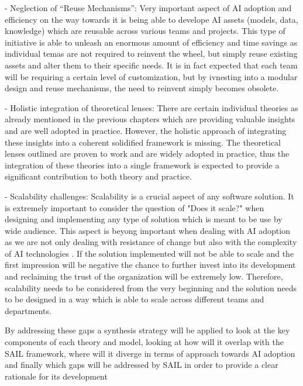 \documentclass[]{imc-inf}
\begin{document}
- Neglection of ``Reuse Mechanisms'': Very important aspect of AI adoption and efficiency on the way towards it is being able to develope AI assets (models, data, knowledge) which are reusable across various teams and projects. This type of initiative is able to unleash an enormous amount of efficiency and time savings as individual temas are not required to reinvent the wheel, but simply reuse existing assets and alter them to their specific needs. It is in fact expected that each team will be requiring a certain level of customization, but by ivnesting into a modular design and reuse mechanisms, the need to reinvent simply becomes obsolete.

- Holistic integration of theoretical lenses: There are certain individual theories as already mentioned in the previous chapters which are providing valuable insights and are well adopted in practice. However, the holistic approach of integrating these insights into a coherent solidified framework is missing. The theoretical lenses outlined are proven to work and are widely adopted in practice, thus the integration of these theories into a single framework is expected to provide a significant contribution to both theory and practice.


- Scalability challenges: Scalability is a crucial aspect of any software solution. It is extremely important to consider the question of "Does it scale?" when designing and implementing any type of solution which is meant to be use by wide audience. This aspect is beyong important when dealing with AI adoption as we are not only dealing with resistance of change but also with the complexity of AI technologies \citep{Keding2021}. If the solution implemented will not be able to scale and the first impression will be negative the chance to further invest into its development and reclaiming the trust of the organization will be extremely low. Therefore, scalability needs to be considered from the very beginning and the solution needs to be designed in a way which is able to scale across different teams and departments.



By addressing these gaps a synthesis strategy will be applied to look at the key components of each theory and model, looking at how will it overlap with the SAIL framework, where will it diverge in terms of approach towards AI adoption and finally which gaps will be addressed by SAIL in order to provide a clear rationale for its development
\end{document}
